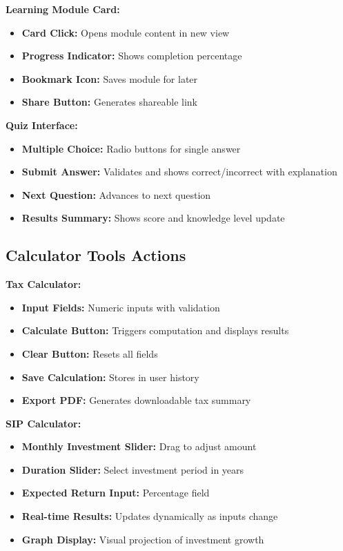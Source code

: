 \documentclass[12pt,a4paper]{report}
\begin{document}
\textbf{Learning Module Card:}
\begin{itemize}
    \item \textbf{Card Click:} Opens module content in new view
    \item \textbf{Progress Indicator:} Shows completion percentage
    \item \textbf{Bookmark Icon:} Saves module for later
    \item \textbf{Share Button:} Generates shareable link
\end{itemize}

\textbf{Quiz Interface:}
\begin{itemize}
    \item \textbf{Multiple Choice:} Radio buttons for single answer
    \item \textbf{Submit Answer:} Validates and shows correct/incorrect with explanation
    \item \textbf{Next Question:} Advances to next question
    \item \textbf{Results Summary:} Shows score and knowledge level update
\end{itemize}

\subsection{Calculator Tools Actions}

\textbf{Tax Calculator:}
\begin{itemize}
    \item \textbf{Input Fields:} Numeric inputs with validation
    \item \textbf{Calculate Button:} Triggers computation and displays results
    \item \textbf{Clear Button:} Resets all fields
    \item \textbf{Save Calculation:} Stores in user history
    \item \textbf{Export PDF:} Generates downloadable tax summary
\end{itemize}

\textbf{SIP Calculator:}
\begin{itemize}
    \item \textbf{Monthly Investment Slider:} Drag to adjust amount
    \item \textbf{Duration Slider:} Select investment period in years
    \item \textbf{Expected Return Input:} Percentage field
    \item \textbf{Real-time Results:} Updates dynamically as inputs change
    \item \textbf{Graph Display:} Visual projection of investment growth
\end{itemize}
\end{document}
